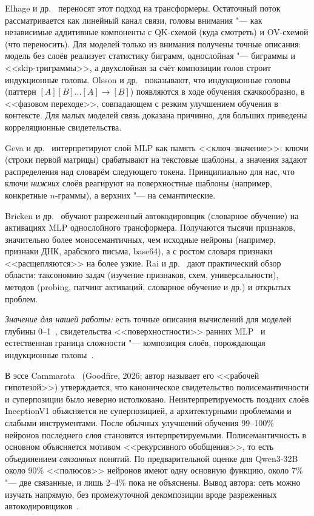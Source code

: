 Elhage и др.~\cite{elhage2021framework} переносят этот подход на
трансформеры. Остаточный поток рассматривается как линейный канал
связи, головы внимания "--- как независимые аддитивные компоненты с
QK-схемой (куда смотреть) и OV-схемой (что переносить). Для моделей
только из внимания получены точные описания: модель без слоёв
реализует статистику биграмм, однослойная "--- биграммы и
<<skip-триграммы>>, а двухслойная за счёт композиции голов строит
индукционные головы. Olsson и др.~\cite{olsson2022induction}
показывают, что индукционные головы (паттерн
$[A][B]\dots[A]\to[B]$) появляются в ходе обучения скачкообразно, в
<<фазовом переходе>>, совпадающем с резким улучшением обучения в
контексте. Для малых моделей связь доказана причинно, для больших
приведены корреляционные свидетельства.

Geva и др.~\cite{geva2021ffn} интерпретируют слой MLP как память
<<ключ--значение>>: ключи (строки первой матрицы) срабатывают на
текстовые шаблоны, а значения задают распределения над словарём
следующего токена. Принципиально для нас, что ключи \emph{нижних}
слоёв реагируют на поверхностные шаблоны (например, конкретные
$n$-граммы), а верхних "--- на семантические.

Bricken и др.~\cite{bricken2023monosemanticity} обучают разреженный
автокодировщик (словарное обучение) на активациях MLP однослойного
трансформера. Получаются тысячи признаков, значительно более
моносемантичных, чем исходные нейроны (например, признаки ДНК,
арабского письма, base64), а с ростом словаря признаки
<<расщепляются>> на более узкие. Rai и др.~\cite{rai2024review}
дают практический обзор области: таксономию задач (изучение
признаков, схем, универсальности), методов (probing, патчинг
активаций, словарное обучение и др.) и открытых проблем.

\emph{Значение для нашей работы:} есть точные описания вычислений
для моделей глубины 0--1~\cite{elhage2021framework}, свидетельства
<<поверхностности>> ранних MLP~\cite{geva2021ffn} и естественная
граница сложности "--- композиция слоёв, порождающая индукционные
головы~\cite{olsson2022induction}.


В эссе Cammarata~\cite{cammarata_clean} (Goodfire, 2026; автор
называет его <<рабочей гипотезой>>) утверждается, что каноническое
свидетельство полисемантичности и суперпозиции было неверно
истолковано. Неинтерпретируемость поздних слоёв InceptionV1 объясняется
не суперпозицией, а архитектурными проблемами и слабыми
инструментами. После обычных улучшений обучения 99--100\% нейронов
последнего слоя становятся интерпретируемыми. Полисемантичность в
основном объясняется мотивом <<рекурсивного обобщения>>, то есть
объединением \emph{связанных} понятий. По предварительной оценке для
Qwen3-32B около 90\% <<полюсов>> нейронов имеют одну основную функцию,
около 7\% "--- две связанные, и лишь 2--4\% пока не объяснены. Вывод
автора: сеть можно изучать напрямую, без промежуточной декомпозиции
вроде разреженных автокодировщиков~\cite{bricken2023monosemanticity}.

